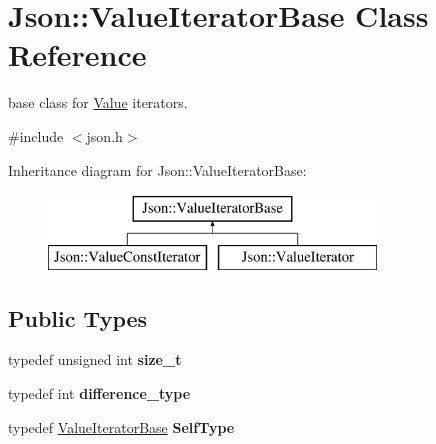 \hypertarget{class_json_1_1_value_iterator_base}{\section{Json\-:\-:Value\-Iterator\-Base Class Reference}
\label{class_json_1_1_value_iterator_base}
}


base class for \hyperlink{class_json_1_1_value}{Value} iterators.  




{\ttfamily \#include $<$json.\-h$>$}

Inheritance diagram for Json\-:\-:Value\-Iterator\-Base\-:\begin{figure}[H]
\begin{center}
\leavevmode
\includegraphics[height=2.000000cm]{class_json_1_1_value_iterator_base}
\end{center}
\end{figure}
\subsection*{Public Types}
\begin{DoxyCompactItemize}
\item 
\hypertarget{class_json_1_1_value_iterator_base_a9d3a3c7ce5cdefe23cb486239cf07bb5}{typedef unsigned int {\bfseries size\-\_\-t}}\label{class_json_1_1_value_iterator_base_a9d3a3c7ce5cdefe23cb486239cf07bb5}

\item 
\hypertarget{class_json_1_1_value_iterator_base_a4e44bf8cbd17ec8d6e2c185904a15ebd}{typedef int {\bfseries difference\-\_\-type}}\label{class_json_1_1_value_iterator_base_a4e44bf8cbd17ec8d6e2c185904a15ebd}

\item 
\hypertarget{class_json_1_1_value_iterator_base_a9d2a940d03ea06d20d972f41a89149ee}{typedef \hyperlink{class_json_1_1_value_iterator_base}{Value\-Iterator\-Base} {\bfseries Self\-Type}}\label{class_json_1_1_value_iterator_base_a9d2a940d03ea06d20d972f41a89149ee}

\end{DoxyCompactItemize}
